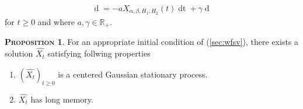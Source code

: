 \documentclass[a4paper, twoside, 11pt]{article}
\theoremstyle{definition}
\newtheorem{proposition}[definition]{\scshape Proposition}
\begin{document}
\begin{eqnarray}
  \mathop{dX_{\alpha,\beta,H_1,H_2}(t)} = -aX_{\alpha,\beta,H_1,H_2}(t)\mathop{dt} + \gamma \mathop{dM_{\alpha,\beta,H_1,H_2}(t)}
  \label{sec:wfsv}
\end{eqnarray}
for $t\ge 0$ and where $a, \gamma \in \mathbb{R}_+$.

\begin{proposition}
  For an appropriate initial condition of (\ref{sec:wfsv}), there exists a solution $\hat{X_t}$ satisfying follwing properties
\begin{enumerate}[topsep=0pt, itemsep=-1ex, partopsep=1ex, parsep=1ex, label=(\roman*)]
  \item $(\hat{X_t})_{t\ge 0}$ is a centered Gaussian stationary process.
  \item $\hat{X_t}$ has long memory.
  \end{enumerate}
\end{proposition}
\end{document}
